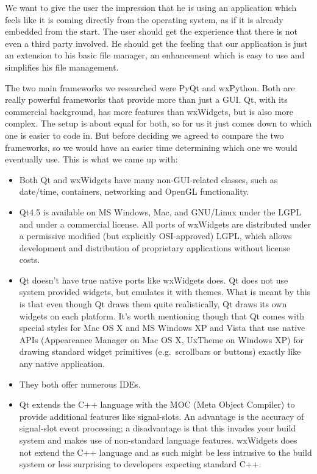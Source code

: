 We want to give the user the impression that he is using an application which feels like it is coming directly from the operating system, as if it is already embedded from the start. The user should get the experience that there is not even a third party involved. He should get the feeling that our application is just an extension to his basic file manager, an enhancement which is easy to use and simplifies his file management.

The two main frameworks we researched were PyQt and wxPython. Both are really powerful frameworks that provide more than just a GUI\@. Qt, with its commercial background, has more features than wxWidgets, but is also more complex. The setup is about equal for both, so for us it just comes down to which one is easier to code in. But before deciding we agreed to compare the two frameworks, so we would have an easier time determining which one we would eventually use. This is what we came up with:

\begin{itemize}
	\item Both Qt and wxWidgets have many non-GUI-related classes, such as date/time, containers, networking and OpenGL functionality.
	\item Qt4.5 is available on MS Windows, Mac, and GNU/Linux under the LGPL and under a commercial license. All ports of wxWidgets are distributed under a permissive modified (but explicitly OSI-approved) LGPL, which allows development and distribution of proprietary applications without license costs.
	\item Qt doesn't have true native ports like wxWidgets does. Qt does not use system provided widgets, but emulates it with themes. What is meant by this is that even though Qt draws them quite realistically, Qt draws its own widgets on each platform. It's worth mentioning though that Qt comes with special styles for Mac OS X and MS Windows XP and Vista that use native APIs (Appeareance Manager on Mac OS X, UxTheme on Windows XP) for drawing standard widget primitives (e.g.\ scrollbars or buttons) exactly like any native application.
	\item They both offer numerous IDEs.
	\item Qt extends the C++ language with the MOC (Meta Object Compiler) to provide additional features like signal-slots. An advantage is the accuracy of signal-slot event processing; a disadvantage is that this invades your build system and makes use of non-standard language features\@. wxWidgets does not extend the C++ language and as such might be less intrusive to the build system or less surprising to developers expecting standard C++.
\end{itemize}

